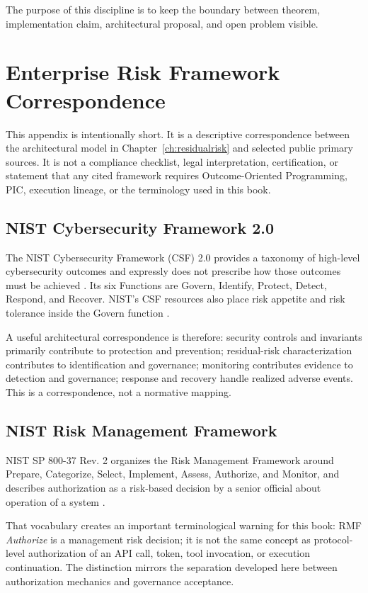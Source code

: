 \documentclass[10pt,oneside,openany]{book}
\begin{document}
The purpose of this discipline is to keep the boundary between theorem, implementation claim, architectural proposal, and open problem visible.

\chapter{Enterprise Risk Framework Correspondence}\label{app:frameworks}

This appendix is intentionally short. It is a descriptive correspondence between the architectural model in Chapter~\ref{ch:residualrisk} and selected public primary sources. It is not a compliance checklist, legal interpretation, certification, or statement that any cited framework requires Outcome-Oriented Programming, PIC, execution lineage, or the terminology used in this book.

\section{NIST Cybersecurity Framework 2.0}
The NIST Cybersecurity Framework (CSF) 2.0 provides a taxonomy of high-level cybersecurity outcomes and expressly does not prescribe how those outcomes must be achieved \cite{nistcsf2024}. Its six Functions are Govern, Identify, Protect, Detect, Respond, and Recover. NIST's CSF resources also place risk appetite and risk tolerance inside the Govern function \cite{nistcsf2024}.

A useful architectural correspondence is therefore: security controls and invariants primarily contribute to protection and prevention; residual-risk characterization contributes to identification and governance; monitoring contributes evidence to detection and governance; response and recovery handle realized adverse events. This is a correspondence, not a normative mapping.

\section{NIST Risk Management Framework}
NIST SP 800-37 Rev. 2 organizes the Risk Management Framework around Prepare, Categorize, Select, Implement, Assess, Authorize, and Monitor, and describes authorization as a risk-based decision by a senior official about operation of a system \cite{nistrmf2018}.

That vocabulary creates an important terminological warning for this book: RMF \emph{Authorize} is a management risk decision; it is not the same concept as protocol-level authorization of an API call, token, tool invocation, or execution continuation. The distinction mirrors the separation developed here between authorization mechanics and governance acceptance.
\end{document}
